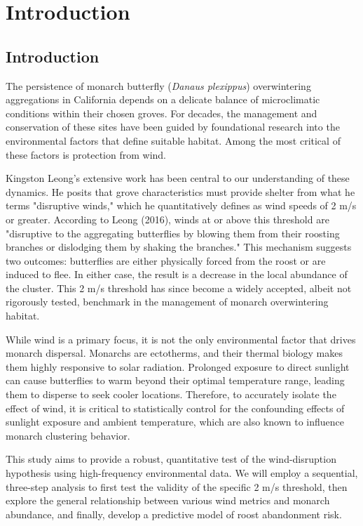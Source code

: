 \chapter{Introduction}
\label{ch:introduction}

\section{Introduction}

The persistence of monarch butterfly (\textit{Danaus plexippus}) overwintering aggregations in California depends on a delicate balance of microclimatic conditions within their chosen groves. For decades, the management and conservation of these sites have been guided by foundational research into the environmental factors that define suitable habitat. Among the most critical of these factors is protection from wind.

Kingston Leong's extensive work has been central to our understanding of these dynamics. He posits that grove characteristics must provide shelter from what he terms "disruptive winds," which he quantitatively defines as wind speeds of 2 m/s or greater. According to Leong (2016), winds at or above this threshold are "disruptive to the aggregating butterflies by blowing them from their roosting branches or dislodging them by shaking the branches." This mechanism suggests two outcomes: butterflies are either physically forced from the roost or are induced to flee. In either case, the result is a decrease in the local abundance of the cluster. This 2 m/s threshold has since become a widely accepted, albeit not rigorously tested, benchmark in the management of monarch overwintering habitat.

While wind is a primary focus, it is not the only environmental factor that drives monarch dispersal. Monarchs are ectotherms, and their thermal biology makes them highly responsive to solar radiation. Prolonged exposure to direct sunlight can cause butterflies to warm beyond their optimal temperature range, leading them to disperse to seek cooler locations. Therefore, to accurately isolate the effect of wind, it is critical to statistically control for the confounding effects of sunlight exposure and ambient temperature, which are also known to influence monarch clustering behavior.

This study aims to provide a robust, quantitative test of the wind-disruption hypothesis using high-frequency environmental data. We will employ a sequential, three-step analysis to first test the validity of the specific 2 m/s threshold, then explore the general relationship between various wind metrics and monarch abundance, and finally, develop a predictive model of roost abandonment risk.

